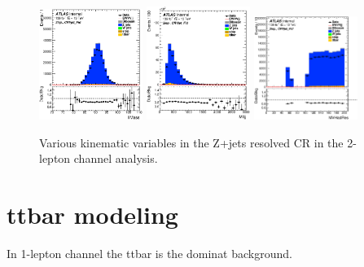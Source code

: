 \begin{figure}[ht]
    \centering
   \includegraphics[width=0.30\textwidth]{figures/2lep/reweighting/after_reweighting/C_0ptag2pjet_0ptv_CRVjet_Fid_llMass_Lin.eps}
   \includegraphics[width=0.30\textwidth]{figures/2lep/reweighting/after_reweighting/C_0ptag2pjet_0ptv_CRVjet_Fid_Mlljj_Lin.eps}
  \includegraphics[width=0.30\textwidth]{figures/2lep/reweighting/after_reweighting/C_0ptag2pjet_0ptv_CRVjet_Fid_MVHadRes_Lin.eps}
  \caption{ Various kinematic variables in the Z+jets resolved CR in the 2-lepton channel analysis.}
   \label{fig:2lep_zjets_resolved_CR}
\end{figure}

\section{ttbar modeling}
In 1-lepton channel the ttbar is the dominat background.

